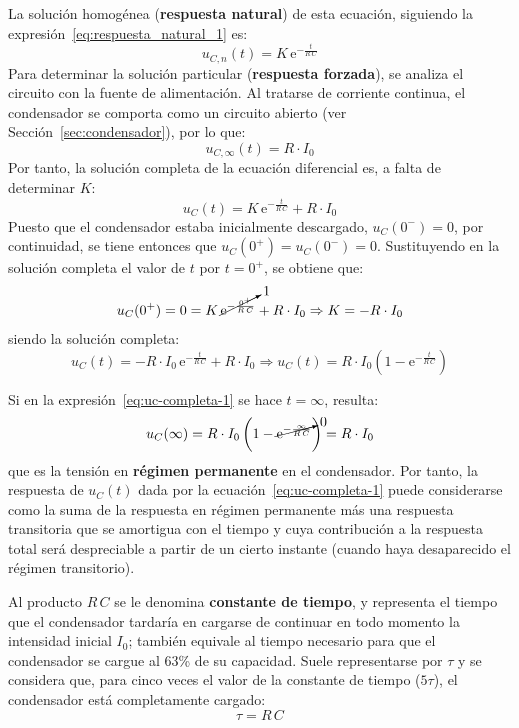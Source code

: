 La solución homogénea (\textbf{respuesta natural}) de esta ecuación,
siguiendo la expresión~\eqref{eq:respuesta_natural_1} es:
\begin{equation}
  \boxed{u_{C,n}(t)=K\,\mathrm{e}^{-\frac{t}{R\,C}}}
\end{equation}
Para determinar la solución particular (\textbf{respuesta forzada}),
se analiza el circuito con la fuente de alimentación. Al tratarse de
corriente continua, el condensador se comporta como un circuito
abierto (ver Sección~\ref{sec:condensador}), por lo que:
\begin{equation}
  \boxed{u_{C,\infty}(t)=R\cdot I_0}
\end{equation}
Por tanto, la solución completa de la ecuación diferencial es, a falta
de determinar $K$:
\begin{equation*}{u_C(t)=K\,\mathrm{e}^{-\frac{t}{R\,C}}+R\cdot I_0}
\end{equation*}
Puesto que el condensador estaba inicialmente descargado,
$u_C(0^-)=0$, por continuidad, se tiene entonces que
$u_C(0^+)=u_C(0^-)=0$. Sustituyendo en la solución completa el valor
de $t$ por $t=0^+$, se obtiene que:
\begin{equation*}
  u_C(0^+)=0=K\,\cancelto{1}{\mathrm{e}^{-\frac{0^+}{R\,C}}}+R\cdot I_0\Rightarrow K=-R\cdot I_0
\end{equation*}
siendo la solución completa:
\begin{equation}\label{eq:uc-completa-1}
  u_C(t)=-R\cdot I_0\,\mathrm{e}^{-\frac{t}{R\,C}}+R\cdot I_0\Rightarrow \boxed{u_C(t) =R\cdot I_0\left(1- \mathrm{e}^{-\frac{t}{R\,C}}\right)}
\end{equation}
	
Si en la expresión~\eqref{eq:uc-completa-1} se hace $t=\infty$,
resulta:
\begin{equation*}
  u_C(\infty)=R\cdot I_0\left(1- \cancelto{0}{\mathrm{e}^{-\frac{\infty}{R\,C}}}\right)=R\cdot I_0
\end{equation*}
que es la tensión en \textbf{régimen permanente} en el
condensador. Por tanto, la respuesta de $u_C(t)$ dada por la
ecuación~\eqref{eq:uc-completa-1} puede considerarse como la suma de
la respuesta en régimen permanente más una respuesta transitoria que
se amortigua con el tiempo y cuya contribución a la respuesta total
será despreciable a partir de un cierto instante (cuando haya
desaparecido el régimen transitorio).
	
Al producto $R\,C$ se le denomina \textbf{constante de tiempo}, y
representa el tiempo que el condensador tardaría en cargarse de
continuar en todo momento la intensidad inicial $I_0$; también
equivale al tiempo necesario para que el condensador se cargue al 63\%
de su capacidad. Suele representarse por $\tau$ y se considera que,
para cinco veces el valor de la constante de tiempo ($5\tau$), el
condensador está completamente cargado:
\begin{equation}
  \boxed{\tau=R\,C}
\end{equation}

